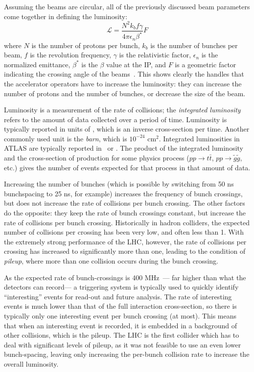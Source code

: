 Assuming the beams are circular, all of the previously discussed beam parameters come together in defining the luminosity:
%
\begin{equation}
\mathcal{L} = \frac{N^2 k_b f \gamma}{4\pi \epsilon_n \beta^*} F
\end{equation}
%
where $N$ is the number of protons per bunch, $k_b$ is the number of bunches per beam, $f$ is the revolution frequency, $\gamma$ is the relativistic factor, $\epsilon_n$ is the normalized emittance, $\beta^*$ is the $\beta$ value at the IP, and $F$ is a geometric factor indicating the crossing angle of the beams~\cite{accelerator-book}. This shows clearly the handles that the accelerator operators have to increase the luminosity: they can increase the number of protons and the number of bunches, or decrease the size of the beam.

Luminosity is a measurement of the rate of collisions; the \textit{integrated luminosity} refers to the amount of data collected over a period of time. Luminosity is typically reported in units of \lumirate, which is an inverse cross-section per time. Another commonly used unit is the \textit{barn}, which is $10^{-24}$ cm$^2$. Integrated luminosities in ATLAS are typically reported in \ipb~or \ifb. The product of the integrated luminosity and the cross-section of production for some physics process ($pp \rightarrow t\bar{t}$, $pp \rightarrow \tilde{g}\tilde{g}$, etc.) gives the number of events expected for that process in that amount of data.

Increasing the number of bunches (which is possible by switching from 50 ns bunchspacing to 25 ns, for example) increases the frequency of bunch crossings, but does not increase the rate of collisions per bunch crossing. The other factors do the opposite: they keep the rate of bunch crossings constant, but increase the rate of collisions per bunch crossing. Historically in hadron colliders, the expected number of collisions per crossing has been very low, and often less than 1. With the extremely strong performance of the LHC, however, the rate of collisions per crossing has increased to significantly more than one, leading to the condition of \textit{pileup}, where more than one collision occurs during the bunch crossing.

As the expected rate of bunch-crossings is 400 MHz~\cite{LHCGuide,LHC2008-2013}--- far higher than what the detectors can record--- a triggering system is typically used to quickly identify ``interesting'' events for read-out and future analysis. The rate of interesting events is much lower than that of the full interaction cross-section, so there is typically only one interesting event per bunch crossing (at most). This means that when an interesting event is recorded, it is embedded in a background of other collisions, which is the pileup. The LHC is the first collider which has to deal with significant levels of pileup, as it was not feasible to use an even lower bunch-spacing, leaving only increasing the per-bunch collision rate to increase the overall luminosity.

